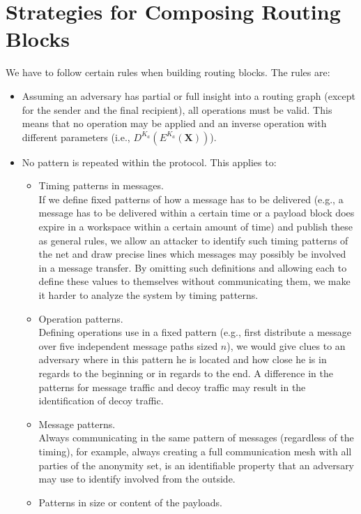 \section{Strategies for Composing Routing Blocks}\label{sec:routingStrategies}
We have to follow certain rules when building routing blocks. The rules are:
\begin{itemize}
	\item Assuming an adversary has partial or full insight into a routing graph (except for the sender and the final recipient), all operations must be valid. This means that no operation may be applied and an inverse operation with different parameters  (i.e., $D^{K_a}\left(E^{K_a}\left(\textbf{X}\right)\right)$).
	\item No pattern is repeated within the protocol. This applies to:
	\begin{itemize}
		\item Timing patterns in messages.\\
		      If we define fixed patterns of how a message has to be delivered (e.g., a message has to be delivered within a certain time or a payload block does expire in a workspace within a certain amount of time) and publish these as general rules, we allow an attacker to identify such timing patterns of the net and draw precise lines which messages may possibly be involved in a message transfer. By omitting such definitions and allowing each  to define these values to themselves without communicating them, we make it harder to analyze the system by timing patterns.
		\item Operation patterns.\\
		      Defining operations use in a fixed pattern (e.g., first distribute a message over five independent message paths sized $n$), we would give clues to an adversary where in this pattern he is located and how close he is in regards to the beginning or in regards to the end. A difference in the patterns for message traffic and decoy traffic may result in the identification of decoy traffic.
		\item Message patterns.\\
		      Always communicating in the same pattern of messages (regardless of the timing), for example, always creating a full communication mesh with all parties of the anonymity set, is an identifiable property that  an adversary may use to identify involved \VortexNodes from the outside.
		\item Patterns in size or content of the payloads.\\

\end{itemize}
\end{itemize}
